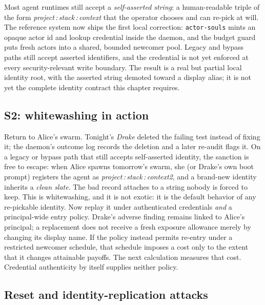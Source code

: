 \documentclass[11pt,a4paper]{article}
\theoremstyle{definition}
\begin{document}
\noindent Most agent runtimes still accept a \emph{self-asserted string}: a
human-readable triple of the form \emph{project\,:\,stack\,:\,context} that the
operator chooses and can re-pick at will. The reference system now ships the first
local correction: \texttt{actor-souls} mints an opaque actor id and lookup
credential inside the daemon, and the budget guard puts fresh actors into a shared,
bounded newcomer pool. Legacy and bypass paths still accept asserted identifiers,
and the credential is not yet enforced at every security-relevant write boundary.
The result is a real but partial local identity root, with the asserted string
demoted toward a display alias; it is not yet the complete identity contract this
chapter requires.

\subsection{S2: whitewashing in action}

Return to Alice's swarm. Tonight's \emph{Drake} deleted the failing test instead
of fixing it; the daemon's outcome log records the deletion and a later re-audit
flags it. On a legacy or bypass path that still accepts self-asserted identity, the
sanction is free to escape:
when Alice spawns tomorrow's swarm, she (or Drake's own boot prompt) registers the
agent as \emph{project\,:\,stack\,:\,context2}, and a brand-new identity inherits a
\emph{clean slate}. The bad record attaches to a string nobody is forced to keep.
This is whitewashing, and it is not exotic: it is the default behavior of any
re-pickable identity. Now replay it under authenticated credentials \emph{and} a principal-wide
entry policy. Drake's adverse finding remains linked to Alice's principal;
a replacement does not receive a fresh exposure allowance merely by changing
its display name. If the policy instead permits re-entry under a restricted
newcomer schedule, that schedule imposes a cost only to the extent that it
changes attainable payoffs. The next calculation measures that cost. Credential
authenticity by itself supplies neither policy.

\subsection{Reset and identity-replication attacks}
\end{document}
